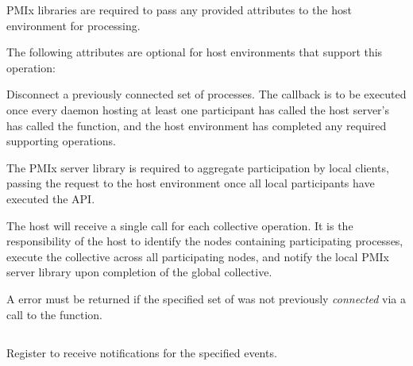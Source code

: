 \reqattrstart
\ac{PMIx} libraries are required to pass any provided attributes to the host environment for processing.
\reqattrend

\optattrstart
The following attributes are optional for host environments that support this operation:


\optattrend

\descr

Disconnect a previously connected set of processes. The callback is to be executed once every daemon hosting at least one participant has called the host server's has called the  function, and the host environment has completed any required supporting operations.

\adviceimplstart
The \ac{PMIx} server library is required to aggregate participation by local clients, passing the request to the host environment once all local participants have executed the \ac{API}.
\adviceimplend

\advicermstart
The host will receive a single call for each collective operation. It is the responsibility of the host to identify the nodes containing participating processes, execute the collective across all participating nodes, and notify the local \ac{PMIx} server library upon completion of the global collective.

A  error must be returned if the specified set of  was not previously \textit{connected} via a call to the  function.
\advicermend


\subsection{}

\summary

Register to receive notifications for the specified events.

\format


